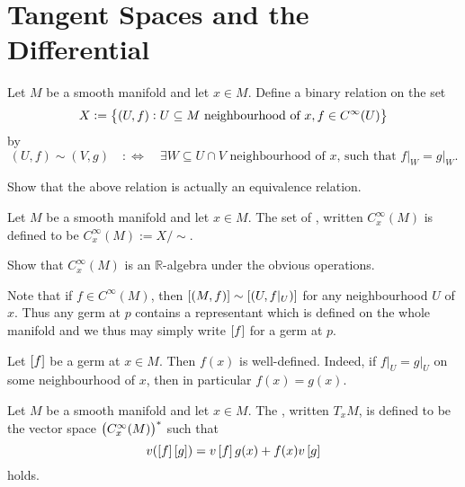 \section*{Tangent Spaces and the Differential}
Let $M$ be a smooth manifold and let $x \in M$. Define a binary relation on the set
\begin{equation*}
	X := \cbr[1]{(U,f) : U \subseteq M \text{ neighbourhood of } x, f \in C^\infty(U)}
\end{equation*}
\noindent by
\begin{equation*}
	(U,f)\sim(V,g) \quad :\Leftrightarrow \quad \exists W \subseteq U \cap V \text{ neighbourhood of $x$, such that } f\vert_W = g\vert_W.
\end{equation*}

\begin{exercise}
	Show that the above relation is actually an equivalence relation.
\end{exercise}

\begin{definition}[Germ]
	Let $M$ be a smooth manifold and let $x \in M$. The set of , written $C^\infty_x(M)$ is defined to be $C^\infty_x(M) := X/{\sim}$.
\end{definition}

\begin{exercise}
	Show that $C^\infty_x(M)$ is an $\mathbb{R}$-algebra under the obvious operations.
\end{exercise}

\begin{remark}
	Note that if $f \in C^\infty(M)$, then $\sbr[0]{(M,f)} \sim \sbr[0]{(U,f\vert_U)}$ for any neighbourhood $U$ of $x$. Thus any germ at $p$ contains a representant which is defined on the whole manifold and we thus may simply write $\sbr[0]{f}$ for a germ at $p$. 
\end{remark}

\begin{remark}
	Let $\sbr[0]{f}$ be a germ at $x \in M$. Then $f(x)$ is well-defined. Indeed, if $f\vert_U = g\vert_U$ on some neighbourhood of $x$, then in particular $f(x) = g(x)$.
\end{remark}

\begin{definition}
	Let $M$ be a smooth manifold and let $x \in M$. The , written $T_xM$, is defined to be the vector space $\del[1]{C^\infty_x(M)}^*$ such that
	\begin{equation*}
		v(\sbr[0]{f}\sbr[0]{g}) = v\sbr[0]{f}g(x) + f(x)v\sbr[0]{g}
	\end{equation*}
	\noindent holds.
\end{definition}

